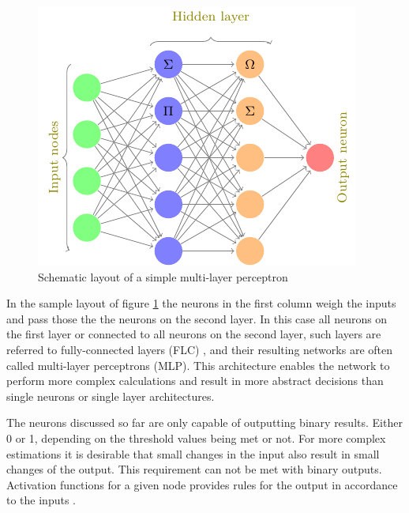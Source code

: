 \begin{figure}[H]
\centering
\includegraphics[height=.25\textheight, width=.5\textwidth]{Figures/neuralnet}
\decoRule
\caption[Schematic layout of a simple multi-layer perceptron]{Schematic layout of a simple multi-layer perceptron}
\label{fig:nn}
\end{figure}

In the sample layout of figure \ref{fig:nn} the neurons in the first column weigh the inputs and pass those
the the neurons on the second layer. In this case all neurons on the first layer or connected to all neurons
on the second layer, such layers are referred to fully-connected layers (FLC) , and their resulting networks
are often called multi-layer perceptrons (MLP). This architecture enables the network to perform more complex
calculations and result in more abstract decisions than single neurons or single layer architectures.

The neurons discussed so far are only capable of outputting binary results. Either 0 or 1, depending on the
threshold values being met or not.  For more complex estimations it is desirable that small changes in the
input also result in small changes of the output. This requirement can not be met with binary
outputs. Activation functions for a given node provides rules for the output in accordance to the inputs
\cite{vzilinskas2006practical}.

